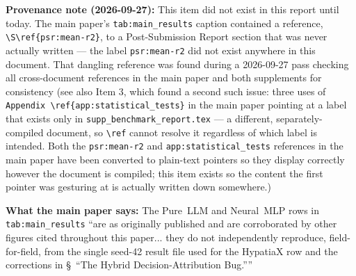 \documentclass[11pt]{article}
\begin{document}
\textbf{Provenance note (2026-09-27):} This item did not exist in this
report until today. The main paper's \texttt{tab:main\_results} caption
contained a reference, \verb|\S\ref{psr:mean-r2}|, to a Post-Submission
Report section that was never actually written — the label
\texttt{psr:mean-r2} did not exist anywhere in this document. That
dangling reference was found during a 2026-09-27 pass checking all
cross-document references in the main paper and both supplements for
consistency (see also Item 3, which found a second such issue: three
uses of \texttt{Appendix~\textbackslash ref\{app:statistical\_tests\}} in
the main paper pointing at a label that exists only in
\texttt{supp\_benchmark\_report.tex} — a different, separately-compiled
document, so \texttt{\textbackslash ref} cannot resolve it regardless of
which label is intended. Both the \texttt{psr:mean-r2} and
\texttt{app:statistical\_tests} references in the main paper have been
converted to plain-text pointers so they display correctly however the
document is compiled; this item exists so the content the first pointer
was gesturing at is actually written down somewhere.)

\textbf{What the main paper says:} The Pure~LLM and Neural~MLP rows in
\texttt{tab:main\_results} ``are as originally published and are
corroborated by other figures cited throughout this paper... they do not
independently reproduce, field-for-field, from the single seed-42 result
file used for the HypatiaX row and the corrections in
\S~``The Hybrid Decision-Attribution Bug.''''
\end{document}
